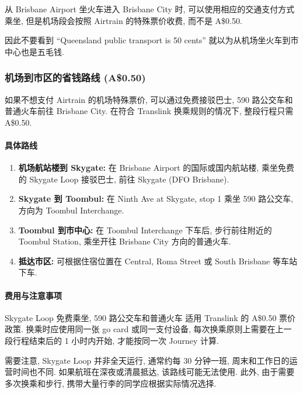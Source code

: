 \documentclass{jit-qut}
\begin{document}
从 Brisbane Airport 坐火车进入 Brisbane City 时, 可以使用相应的交通支付方式乘坐, 但是机场段会按照 Airtrain 的特殊票价收费, 而不是 A\$0.50. 

因此不要看到 ``Queensland public transport is 50 cents'' 就以为从机场坐火车到市中心也是五毛钱. 


\subsubsection{机场到市区的省钱路线 (A\$0.50)}

如果不想支付 Airtrain 的机场特殊票价,
可以通过免费接驳巴士, 590 路公交车和普通火车前往
Brisbane City. 在符合 Translink 换乘规则的情况下,
整段行程只需 A\$0.50.

\paragraph{具体路线}

\begin{enumerate}[itemsep=0.3em,topsep=0.3em]
  \item \textbf{机场航站楼到 Skygate:}
  在 Brisbane Airport 的国际或国内航站楼,
  乘坐免费的 Skygate Loop 接驳巴士,
  前往 Skygate (DFO Brisbane).

  \item \textbf{Skygate 到 Toombul:}
  在 Ninth Ave at Skygate, stop 1
  乘坐 590 路公交车,
  方向为 Toombul Interchange.

  \item \textbf{Toombul 到市中心:}
  在 Toombul Interchange 下车后,
  步行前往附近的 Toombul Station,
  乘坐开往 Brisbane City 方向的普通火车.

  \item \textbf{抵达市区:}
  可根据住宿位置在 Central,
  Roma Street 或 South Brisbane 等车站下车.
\end{enumerate}

\paragraph{费用与注意事项}

Skygate Loop 免费乘坐, 590 路公交车和普通火车
适用 Translink 的 A\$0.50 票价政策.
换乘时应使用同一张 go card 或同一支付设备,
每次换乘原则上需要在上一段行程结束后的
1 小时内开始, 才能按同一次 Journey 计算.

需要注意, Skygate Loop 并非全天运行,
通常约每 30 分钟一班, 周末和工作日的运营时间也不同.
如果航班在深夜或清晨抵达, 该路线可能无法使用.
此外, 由于需要多次换乘和步行,
携带大量行李的同学应根据实际情况选择.
\end{document}
